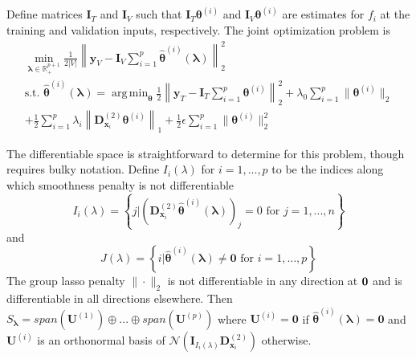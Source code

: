\documentclass[12pt]{article}
\DeclareMathOperator*{\argmin}{arg\,min}
\begin{document}
Define matrices $\boldsymbol{I}_T$ and $\boldsymbol{I}_V$ such that $\boldsymbol I_T \boldsymbol{\theta}^{(i)}$ and $\boldsymbol I_V \boldsymbol{\theta}^{(i)}$ are estimates for $f_i$ at the training and validation inputs, respectively. The joint optimization problem is
\begin{equation}
\begin{array}{c}
\min_{\boldsymbol\lambda \in \mathbb{R}^{p+1}_{+}} \frac{1}{2|V|}
\left \|
\boldsymbol{y}_V
- \boldsymbol{I}_V \sum_{i=1}^p \hat{\boldsymbol{\theta}}^{(i)}(\boldsymbol{\lambda})
\right \|^2_2 \\
\text{s.t. }
\hat{\boldsymbol{\theta}}^{(i)}(\boldsymbol{\lambda}) =
\argmin_{\boldsymbol{\theta}}
\frac{1}{2} \left \|
\boldsymbol{y}_T
- \boldsymbol{I}_T \sum_{i=1}^p \boldsymbol{\theta}^{(i)} \right \|^2_2
+ \lambda_0 \sum_{i=1}^p \| \boldsymbol{\theta}^{(i)} \|_2 \\
+ \frac{1}{2} \sum_{i=1}^p \lambda_i \left \| \boldsymbol{D}^{(2)}_{\boldsymbol{x}_i} \boldsymbol{\theta}^{(i)} \right \|_1
+ \frac{1}{2} \epsilon \sum_{i=1}^p \| \boldsymbol{\theta}^{(i)} \|_2^2
\end{array}
\label{aplmProblem}
\end{equation}


The differentiable space is straightforward to determine for this problem, though requires bulky notation. Define $I_i(\lambda)$ for $i=1,...,p$ to be the indices along which smoothness penalty is not differentiable
\begin{equation}
I_i(\lambda) = \left \{j | \left (\boldsymbol{D}^{(2)}_{\boldsymbol{x}_i} \hat{\boldsymbol \theta}^{(i)}(\boldsymbol\lambda) \right )_j = 0 \text{ for } j=1,...,n \right \}
\end{equation}
and
\begin{equation}
J(\lambda) = \left \{ i | \hat{\boldsymbol \theta}^{(i)}(\boldsymbol\lambda) \ne \boldsymbol 0 \text{ for } i=1,...,p \right \}
\end{equation}
The group lasso penalty $\|\cdot\|_2$ is not differentiable in any direction at ${\bf 0}$ and is differentiable in all directions elsewhere. Then $S_{\boldsymbol \lambda} = span(\boldsymbol {U}^{(1)}) \oplus ... \oplus span(\boldsymbol {U}^{(p)}) $ where $\boldsymbol {U}^{(i)} = \boldsymbol{0}$ if $\hat{\boldsymbol \theta}^{(i)}(\boldsymbol\lambda) = \boldsymbol 0$ and $\boldsymbol {U}^{(i)}$ is an orthonormal basis of $\mathcal{N}(\boldsymbol{I}_{I_i(\lambda)}\boldsymbol{D}^{(2)}_{\boldsymbol{x}_i})$ otherwise.
\end{document}
